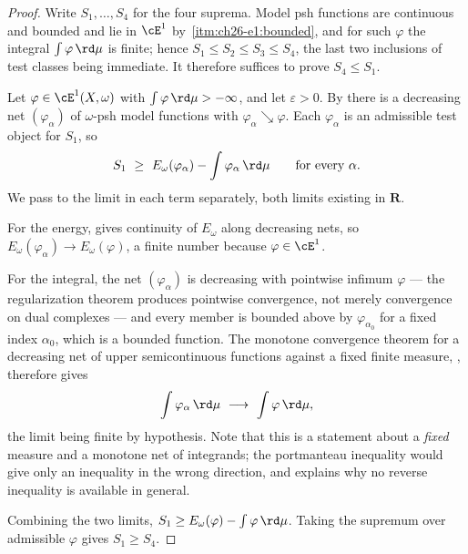 \begin{proof}
Write \(S_1,\ldots,S_4\) for the four suprema.  Model psh functions are
continuous and bounded and lie in \(\cE^1\) by
\,\cref{itm:ch26-e1:bounded}, and for such
\(\varphi\) the integral \(\int\varphi\,\rd\mu\) is finite; hence
\(S_1\leq S_2\leq S_3\leq S_4\), the last two inclusions of test classes
being immediate.  It therefore suffices to prove \(S_4\leq S_1\).

Let \(\varphi\in\cE^1(X,\omega)\) with \(\int\varphi\,\rd\mu>-\infty\), and
let \(\varepsilon>0\).  By  there is
a decreasing net \((\varphi_\alpha)\) of \(\omega\)-psh model functions with
\(\varphi_\alpha\searrow\varphi\).  Each \(\varphi_\alpha\) is an admissible
test object for \(S_1\), so
\[
 S_1\ \geq\ E_\omega(\varphi_\alpha)-\int\varphi_\alpha\,\rd\mu
 \qquad\text{for every }\alpha .
\]
We pass to the limit in each term separately, both limits existing in
\(\mathbf R\).

For the energy,  gives continuity of
\(E_\omega\) along decreasing nets, so
\(E_\omega(\varphi_\alpha)\to E_\omega(\varphi)\), a finite number because
\(\varphi\in\cE^1\).

For the integral, the net \((\varphi_\alpha)\) is decreasing with pointwise
infimum \(\varphi\) --- the regularization theorem produces pointwise
convergence, not merely convergence on dual complexes --- and every member
is bounded above by \(\varphi_{\alpha_0}\) for a fixed index
\(\alpha_0\), which is a bounded function.  The monotone convergence theorem
for a decreasing net of upper semicontinuous functions against a fixed finite
measure, , therefore gives
\[
 \int\varphi_\alpha\,\rd\mu\ \longrightarrow\ \int\varphi\,\rd\mu ,
\]
the limit being finite by hypothesis.  Note that this is a statement about a
\emph{fixed} measure and a monotone net of integrands; the portmanteau
inequality  would give only an inequality in the
wrong direction, and  explains why no
reverse inequality is available in general.

Combining the two limits, \(S_1\geq E_\omega(\varphi)-\int\varphi\,\rd\mu\).
Taking the supremum over admissible \(\varphi\) gives \(S_1\geq S_4\).
\end{proof}

